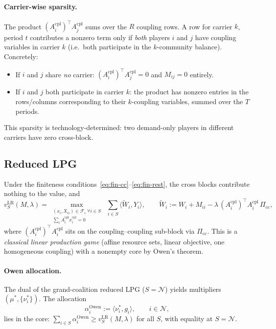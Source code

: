 \documentclass[11pt]{article}
\theoremstyle{definition}
\newcommand{\N}{\mathcal{N}}
\newcommand{\inner}[2]{\langle #1, #2 \rangle}
\newcommand{\xcom}{x^{\mathrm{cpl}}}
\newcommand{\Acom}{A^{\mathrm{cpl}}}
\newcommand{\liftset}{\mathcal{F}}
\newcommand{\vlr}{v^{\mathrm{LR}}}
\begin{document}
\paragraph{Carrier-wise sparsity.}
The product $(\Acom_i)^{\top}\Acom_j$ sums over the $R$ coupling rows.
A row for carrier $k$, period $t$ contributes a nonzero term only if
\emph{both} players $i$ and $j$ have coupling variables in carrier $k$
(i.e.\ both participate in the $k$-community balance).  Concretely:
\begin{itemize}[leftmargin=1.2em]
\item If $i$ and $j$ share \emph{no} carrier:
  $(\Acom_i)^{\top}\Acom_j=0$ and $M_{ij}=0$ entirely.
\item If $i$ and $j$ both participate in carrier $k$: the product has
  nonzero entries in the rows/columns corresponding to their
  $k$-coupling variables, summed over the $T$ periods.
\end{itemize}
This sparsity is technology-determined: two demand-only players in
different carriers have zero cross-block.

\subsection{Reduced LPG}

Under the finiteness conditions~\eqref{eq:fin-cc}--\eqref{eq:fin-rest},
the cross blocks contribute nothing to the value, and
\begin{equation}
\boxed{
\vlr_S(M,\lambda)=\max_{\substack{(x_i,X_{ii})\in\liftset_i\;\forall i\in S\\
\sum_i\Acom_i\xcom_i=0}}\;
\sum_{i\in S}\inner{\widetilde W_i}{Y_i},
\qquad
\widetilde W_i:=W_i+M_{ii}
  -\lambda\,(\Acom_i)^{\top}\Acom_i\,\Pi_{\mathrm{cc}},}
\label{eq:reduced}
\end{equation}
where $(\Acom_i)^{\top}\Acom_i$ sits on the coupling--coupling sub-block
via $\Pi_{\mathrm{cc}}$.  This is a \emph{classical linear production
game} (affine resource sets, linear objective, one homogeneous coupling)
with a nonempty core by Owen's theorem.

\paragraph{Owen allocation.}
The dual of the grand-coalition reduced LPG ($S=\N$) yields multipliers
$(\mu^{*},\{\nu_i^{*}\})$.  The allocation
\begin{equation}
\alpha^{\mathrm{Owen}}_i:=\inner{\nu_i^{*}}{g_i},\qquad i\in\N,
\label{eq:owen}
\end{equation}
lies in the core: $\sum_{i\in S}\alpha^{\mathrm{Owen}}_i
\ge\vlr_S(M,\lambda)$ for all $S$, with equality at $S=\N$.
\end{document}
